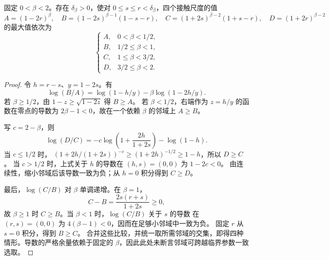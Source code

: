 \begin{lemma}[二维局部主导尺度]\label{fix:active-branches}
固定 $0<\beta<2$。存在 $\delta_\beta>0$，使对
$0\le s\le r<\delta_\beta$，四个接触尺度的值
\[
 A=(1-2r)^\beta,\quad
 B=(1-2s)^{\beta-1}(1-s-r),\quad
 C=(1+2s)^{\beta-2}(1+s-r),\quad
 D=(1+2r)^{\beta-2}
\]
的最大值依次为
\[
 \begin{cases}
 A,&0<\beta<1/2,\\
 B,&1/2\le\beta<1,\\
 C,&1\le\beta<3/2,\\
 D,&3/2\le\beta<2.
 \end{cases}
\]
\end{lemma}
\begin{proof}
令 $h=r-s$、$y=1-2s$。有
\[
 \log(B/A)=\log(1-h/y)-\beta\log(1-2h/y).
\]
若 $\beta\ge1/2$，由 $1-z\ge\sqrt{1-2z}$ 得 $B\ge A$。
若 $\beta<1/2$，右端作为 $z=h/y$ 的函数在零点的导数为
$2\beta-1<0$，故在一个依赖 $\beta$ 的邻域上 $A\ge B$。

写 $c=2-\beta$，则
\[
 \log(D/C)=-c\log\left(1+\frac{2h}{1+2s}\right)-\log(1-h).
\]
当 $c\le1/2$ 时，
$(1+2h/(1+2s))^{-c}\ge(1+2h)^{-1/2}\ge1-h$，所以 $D\ge C$。
当 $c>1/2$ 时，上式关于 $h$ 的导数在 $(h,s)=(0,0)$ 为 $1-2c<0$。
由连续性，缩小邻域后该导数一致为负；从 $h=0$ 积分得到 $C\ge D$。

最后，$\log(C/B)$ 对 $\beta$ 单调递增。在 $\beta=1$，
\[
 C-B=\frac{2s(r+s)}{1+2s}\ge0,
\]
故 $\beta\ge1$ 时 $C\ge B$。当 $\beta<1$ 时，$\log(C/B)$ 关于 $s$ 的导数
在 $(r,s)=(0,0)$ 为 $4(\beta-1)<0$，因而在足够小邻域中一致为负。
固定 $r$ 从 $s=0$ 积分，得到 $B\ge C$。
合并这些比较，并统一取所需邻域的交集，即得四种情形。导数的严格余量依赖于固定的
$\beta$，因此此处未断言邻域可跨越临界参数一致选取。
\end{proof}

